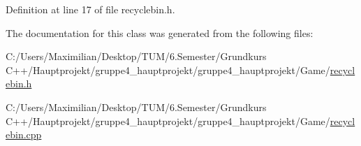 Definition at line 17 of file recyclebin.\+h.



The documentation for this class was generated from the following files\+:\begin{DoxyCompactItemize}
\item 
C\+:/\+Users/\+Maximilian/\+Desktop/\+T\+U\+M/6.\+Semester/\+Grundkurs C++/\+Hauptprojekt/gruppe4\+\_\+hauptprojekt/gruppe4\+\_\+hauptprojekt/\+Game/\hyperlink{recyclebin_8h}{recyclebin.\+h}\item 
C\+:/\+Users/\+Maximilian/\+Desktop/\+T\+U\+M/6.\+Semester/\+Grundkurs C++/\+Hauptprojekt/gruppe4\+\_\+hauptprojekt/gruppe4\+\_\+hauptprojekt/\+Game/\hyperlink{recyclebin_8cpp}{recyclebin.\+cpp}\end{DoxyCompactItemize}
